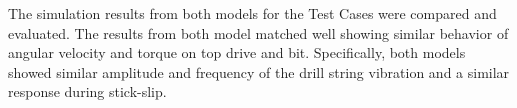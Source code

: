 The simulation results from both models for the Test Cases were compared and evaluated. The results from both model matched well showing similar behavior of angular velocity and torque on top drive and bit. Specifically, both models showed similar amplitude and frequency of the drill string vibration and a similar response during stick-slip.


